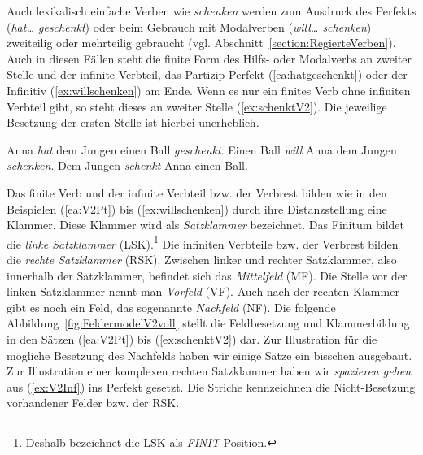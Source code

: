 Auch lexikalisch einfache Verben wie \textit{schenken} werden \zB zum Ausdruck des Perfekts (\textit{hat\ldots{} geschenkt}) oder beim Gebrauch mit Modalverben (\textit{will\ldots{} schenken}) zweiteilig oder mehrteilig gebraucht (vgl. Abschnitt~\ref{section:RegierteVerben}). Auch in diesen Fällen steht die finite Form des Hilfs- oder Modalverbs an zweiter Stelle und der infinite Verbteil, das Partizip Perfekt (\ref{ea:hatgeschenkt}) oder der Infinitiv (\ref{ex:willschenken}) am Ende. Wenn es nur ein finites Verb ohne infiniten Verbteil gibt, so steht dieses an zweiter Stelle (\ref{ex:schenktV2}). Die jeweilige Besetzung der ersten Stelle ist hierbei unerheblich.

\ea 
\ea \label{ea:hatgeschenkt} Anna \textit{hat} dem Jungen einen Ball \textit{geschenkt}.
\ex \label{ex:willschenken} Einen Ball \textit{will} Anna dem Jungen \textit{schenken}.
\ex \label{ex:schenktV2} Dem Jungen \textit{schenkt} Anna einen Ball.
\z 
\z 

Das finite Verb und der infinite Verbteil bzw. der Verbrest bilden wie in den Beispielen (\ref{ea:V2Pt}) bis (\ref{ex:willschenken}) durch ihre Distanzstellung eine Klammer. Diese Klammer wird als \textit{Satzklammer} bezeichnet. Das Finitum bildet die \textit{linke Satzklammer} (LSK).\footnote{Deshalb bezeichnet \citet[280]{Hoehle19862018} die LSK als \textit{FINIT}-Position.} Die infiniten Verbteile bzw. der Verbrest  bilden die \textit{rechte Satzklammer} (RSK). Zwischen linker und rechter Satzklammer, also innerhalb der Satzklammer, befindet sich das \textit{Mittelfeld} (MF). Die Stelle vor der linken Satzklammer nennt man \textit{Vorfeld} (VF). Auch nach der rechten Klammer gibt es noch ein Feld, das sogenannte \textit{Nachfeld} (NF). Die folgende Abbildung~\ref{fig:FeldermodelV2voll} stellt die Feldbesetzung und Klammerbildung in den Sätzen (\ref{ea:V2Pt}) bis (\ref{ex:schenktV2}) dar. Zur Illustration für die mögliche Besetzung des Nachfelds haben wir einige Sätze ein bisschen ausgebaut. Zur Illustration einer komplexen rechten Satzklammer haben wir \textit{spazieren gehen} aus (\ref{ex:V2Inf}) ins Perfekt gesetzt. Die Striche kennzeichnen die Nicht-Besetzung vorhandener Felder bzw. der RSK. 

